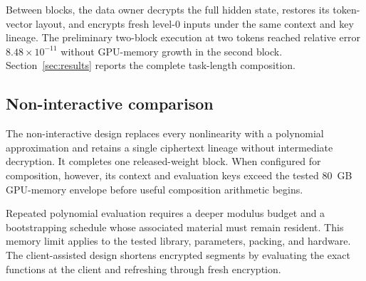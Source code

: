 Between blocks, the data owner decrypts the full hidden state, restores its token-vector layout,
and encrypts fresh level-$0$ inputs under the same context and key lineage. The preliminary
two-block execution at two tokens reached relative error $8.48\times10^{-11}$ without GPU-memory
growth in the second block. Section~\ref{sec:results} reports the complete task-length composition.

\subsection{Non-interactive comparison}
The non-interactive design replaces every nonlinearity with a polynomial approximation and
retains a single ciphertext lineage without intermediate decryption. It completes one
released-weight block. When configured for composition, however, its context and evaluation keys
exceed the tested $80$~GB GPU-memory envelope before useful composition arithmetic begins.

Repeated polynomial evaluation requires a deeper modulus budget and a bootstrapping schedule
whose associated material must remain resident. This memory limit applies to the tested library,
parameters, packing, and hardware. The client-assisted design shortens encrypted segments by
evaluating the exact functions at the client and refreshing through fresh encryption.
